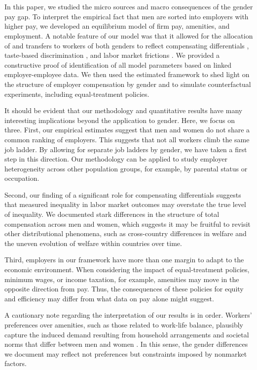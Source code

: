 

\section{{\sectionnine}\label{sec:Conclusion}}

In this paper, we studied the micro sources and macro consequences of the gender pay gap. To interpret the empirical fact that men are sorted into employers with higher pay, we developed an equilibrium model of firm pay, amenities, and employment. A notable feature of our model was that it allowed for the allocation of and transfers to workers of both genders to reflect compensating differentials \citep{Rosen1986}, taste-based discrimination \citep{becker1971}, and labor market frictions \citep{Manning2003}. We provided a constructive proof of identification of all model parameters based on linked employer-employee data. We then used the estimated framework to shed light on the structure of employer compensation by gender and to simulate counterfactual experiments, including equal-treatment policies.

It should be evident that our methodology and quantitative results have many interesting implications beyond the application to gender. Here, we focus on three. %
%
First, our empirical estimates suggest that men and women do not share a common ranking of employers. This suggests that not all workers climb the same job ladder. By allowing for separate job ladders by gender, we have taken a first step in this direction. Our methodology can be applied to study employer heterogeneity across other population groups, for example, by parental status or occupation.

Second, our finding of a significant role for compensating differentials suggests that measured inequality in labor market outcomes may overstate the true level of inequality. We documented stark differences in the structure of total compensation across men and women, which suggests it may be fruitful to revisit other distributional phenomena, such as cross-country differences in welfare and the uneven evolution of welfare within countries over time.

Third, employers in our framework have more than one margin to adapt to the economic environment. When considering the impact of equal-treatment policies, minimum wages, or income taxation, for example, amenities may move in the opposite direction from pay. Thus, the consequences of these policies for equity and efficiency may differ from what data on pay alone might suggest.

A cautionary note regarding the interpretation of our results is in order. Workers' preferences over amenities, such as those related to work-life balance, plausibly capture the induced demand resulting from household arrangements and societal norms that differ between men and women \citep{Goldin2014, Goldin2024, CubasJuhnSilos2021, CubasJuhnSilos2023}. In this sense, the gender differences we document may reflect not preferences but constraints imposed by nonmarket factors.
